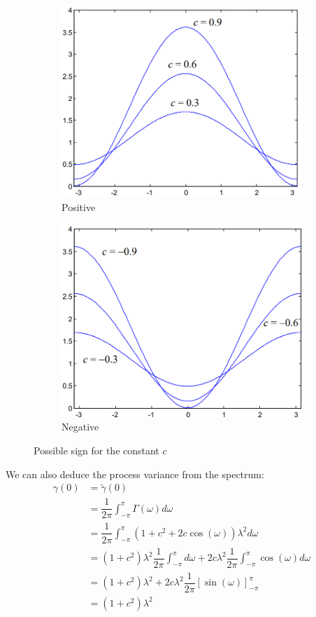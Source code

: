 \begin{figure}[H]
    \centering
    \begin{subfigure}{0.49\textwidth}
        \centering
        \includegraphics[width=0.6\linewidth]{images/cp.png} 
        \caption{Positive}
    \end{subfigure}
    \begin{subfigure}{0.49\textwidth}
        \centering
        \includegraphics[width=0.6\linewidth]{images/cn.png}
        \caption{Negative}
    \end{subfigure}
    \caption{Possible sign for the constant $c$}
\end{figure}
We can also deduce the process variance from the spectrum:
\begin{align*}
    \gamma(0)   &= \tilde{\gamma}(0) \\
                &= \dfrac{1}{2\pi}\int_{-\pi}^{\pi}\Gamma(\omega)d\omega \\
                &= \dfrac{1}{2\pi}\int_{-\pi}^{\pi}\left(1+c^2+2c\cos(\omega)\right)\lambda^2d\omega \\
                &= \left(1+c^2\right)\lambda^2 \dfrac{1}{2\pi}\int_{-\pi}^{\pi}d\omega+ 2c\lambda^2\dfrac{1}{2\pi}\int_{-\pi}^{\pi}\cos(\omega)d\omega \\
                &= \left(1+c^2\right)\lambda^2 + 2c\lambda^2\dfrac{1}{2\pi}\left[\sin(\omega)\right]^{\pi}_{-\pi} \\
                &= \left(1+c^2\right)\lambda^2
\end{align*}

